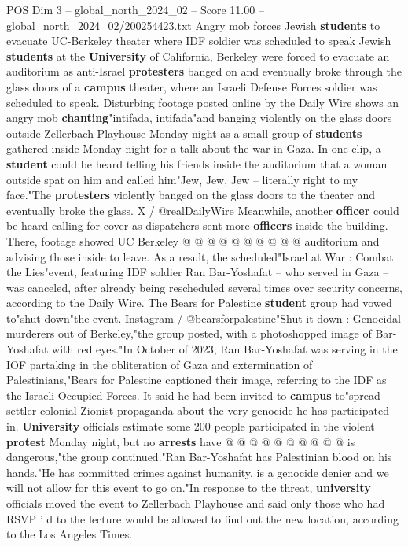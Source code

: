 \begin{textsample}{POS Dim 3 – global\_north\_2024\_02 – Score 11.00 – global\_north\_2024\_02/200254423.txt}  \label{ex:f3_pos_256}
Angry mob forces Jewish \textbf{students} to evacuate UC-Berkeley theater where IDF soldier was scheduled to speak Jewish \textbf{students} at the \textbf{University} of California, Berkeley were forced to evacuate an auditorium as anti-Israel \textbf{protesters} banged on and eventually broke through the glass doors of a \textbf{campus} theater, where an Israeli Defense Forces soldier was scheduled to speak.
Disturbing footage posted online by the Daily Wire shows an angry mob \textbf{chanting}"intifada, intifada"and banging violently on the glass doors outside Zellerbach Playhouse Monday night as a small group of \textbf{students} gathered inside Monday night for a talk about the war in Gaza.
In one clip, a \textbf{student} could be heard telling his friends inside the auditorium that a woman outside spat on him and called him"Jew, Jew, Jew -- literally right to my face."The \textbf{protesters} violently banged on the glass doors to the theater and eventually broke the glass.
X / @realDailyWire Meanwhile, another \textbf{officer} could be heard calling for cover as dispatchers sent more \textbf{officers} inside the building.
There, footage showed UC Berkeley @ @ @ @ @ @ @ @ @ @ auditorium and advising those inside to leave.
As a result, the scheduled"Israel at War : Combat the Lies"event, featuring IDF soldier Ran Bar-Yoshafat -- who served in Gaza -- was canceled, after already being rescheduled several times over security concerns, according to the Daily Wire.
The Bears for Palestine \textbf{student} group had vowed to"shut down"the event.
Instagram / @bearsforpalestine"Shut it down : Genocidal murderers out of Berkeley,"the group posted, with a photoshopped image of Bar-Yoshafat with red eyes."In October of 2023, Ran Bar-Yoshafat was serving in the IOF partaking in the obliteration of Gaza and extermination of Palestinians,"Bears for Palestine captioned their image, referring to the IDF as the Israeli Occupied Forces.
It said he had been invited to \textbf{campus} to"spread settler colonial Zionist propaganda about the very genocide he has participated in. \textbf{University} officials estimate some 200 people participated in the violent \textbf{protest} Monday night, but no \textbf{arrests} have @ @ @ @ @ @ @ @ @ @ is dangerous,"the group continued."Ran Bar-Yoshafat has Palestinian blood on his hands."He has committed crimes against humanity, is a genocide denier and we will not allow for this event to go on."In response to the threat, \textbf{university} officials moved the event to Zellerbach Playhouse and said only those who had RSVP ' d to the lecture would be allowed to find out the new location, according to the Los Angeles Times.

\end{textsample}

